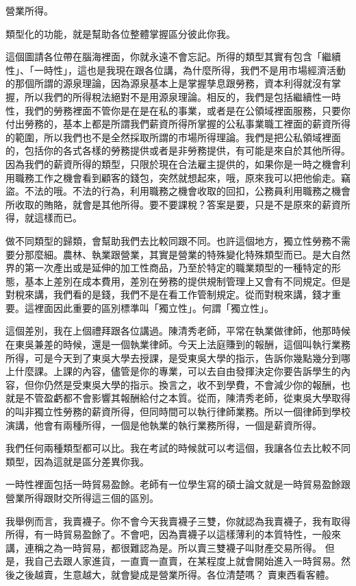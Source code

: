 \documentclass[oneside,sub3section]{ctexbook}
\begin{document}
營業所得。

類型化的功能，就是幫助各位整體掌握區分彼此你我。

這個圖請各位帶在腦海裡面，你就永遠不會忘記。所得的類型其實有包含「繼續性」、「一時性」，這也是我現在跟各位講，為什麼所得，我們不是用市場經濟活動的那個所謂的源泉理論，因為源泉基本上是掌握孳息跟勞務，資本利得就沒有掌握，所以我們的所得稅法絕對不是用源泉理論。相反的，我們是包括繼續性一時性，我們的勞務裡面不管你是在是在私的事業，或者是在公領域裡面服務，只要你付出勞務的，基本上都是所謂我們薪資所得所掌握的公私事業職工裡面的薪資所得的範圍，所以我們也不是全然採取所謂的市場所得理論。我們是把公私領域裡面的，包括你的各式各樣的勞務提供或者是非勞務提供，有可能是來自於其他所得。因為我們的薪資所得的類型，只限於現在合法雇主提供的，如果你是一時之機會利用職務工作之機會看到顧客的錢包，突然就想起來，哦，原來我可以把他偷走。竊盜。不法的哦。不法的行為，利用職務之機會收取的回扣，公務員利用職務之機會所收取的賄賂，就會是其他所得。要不要課稅？答案是要，只是不是原來的薪資所得，就這樣而已。

做不同類型的歸類，會幫助我們去比較同跟不同。也許這個地方，獨立性勞務不需要分那麼細。農林、執業跟營業，其實是營業的特殊變化特殊類型而已。是大自然界的第一次產出或是延伸的加工性商品，乃至於特定的職業類型的一種特定的形態，基本上差別在成本費用，差別在勞務的提供規制管理上又會有不同規定。但是對稅來講，我們看的是錢，我們不是在看工作管制規定。從而對稅來講，錢才重要。這裡面因此重要的區別標準叫「獨立性」。何謂「獨立性」。

這個差別，我在上個禮拜跟各位講過。陳清秀老師，平常在執業做律師，他那時候在東吳兼差的時候，還是一個執業律師。今天上法庭賺到的報酬，這個叫執行業務所得，可是今天到了東吳大學去授課，是受東吳大學的指示，告訴你幾點幾分到哪上什麼課。上課的內容，儘管是你的專業，可以去自由發揮決定你要告訴學生的內容，但你仍然是受東吳大學的指示。換言之，收不到學費，不會減少你的報酬，也就是不管盈虧都不會影響其報酬給付之本質。從而，陳清秀老師，從東吳大學取得的叫非獨立性勞務的薪資所得，但同時間可以執行律師業務。所以一個律師到學校演講，他會有兩種所得，一個是他執業的執行業務所得，一個是薪資所得。

我們任何兩種類型都可以比。我在考試的時候就可以考這個，我讓各位去比較不同類型，因為這就是區分差異你我。

一時性裡面包括一時貿易盈餘。老師有一位學生寫的碩士論文就是一時貿易盈餘跟營業所得跟財交所得這三個的區別。

我舉例而言，我賣襪子。你不會今天我賣襪子三雙，你就認為我賣襪子，我有取得所得，有一時貿易盈餘了。不會吧，因為賣襪子以這樣薄利的本質特性，一般來講，連稱之為一時貿易，都很難認為是。所以賣三雙襪子叫財產交易所得。
但是，我自己去跟人家進貨，一直賣一直賣，在某程度上就會開始進入一時貿易。然後之後越賣，生意越大，就會變成是營業所得。各位清楚嗎？ 賣東西看客體。
\end{document}
